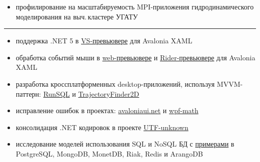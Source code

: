 \documentclass[10pt,a4paper,ragged2e,withhyper]{altacv}
\begin{document}
\begin{paracol}{2}
\begin{itemize}
  \item профилирование на масштабируемость  MPI-приложения
  \newline гидродинамического моделирования на выч.\,кластере УГАТУ

\end{itemize}

{\color{headingrule}\rule{\linewidth}{1pt}\par}\medskip


\smallskip

\begin{itemize}

  \item поддержка .NET 5 в
  \href{https://github.com/AvaloniaUI/AvaloniaVS/pull/181}{VS-превьювере}
  для Avalonia XAML 
  \smallskip

  \item обработка событий мыши в
  \href{https://github.com/AvaloniaUI/Avalonia/pull/4418}{web-превьювере}
  и \href{https://github.com/ForNeVeR/AvaloniaRider/pull/82}{Rider-превьювере}
  для Avalonia XAML 
  \smallskip

  \item разработка кроссплатформенных desktop-приложений, используя MVVM-паттерн:
  \href{https://github.com/rstm-sf/RunSQL}{RunSQL} и
  \href{https://github.com/rstm-sf/TrajectoryFinder2D}{TrajectoryFinder2D}
  \smallskip

  \item исправление ошибок в проектах:
  \href{https://github.com/AvaloniaUI/avaloniaui.net/commits?author=rstm-sf}{avaloniaui.net} и
  \href{https://github.com/ForNeVeR/wpf-math/commits?author=rstm-sf}{wpf-math}
  \smallskip

  \item консолидация .NET кодировок в проекте 
  \href{https://github.com/CharsetDetector/UTF-unknown/commits?author=rstm-sf}{UTF-unknown}
  \smallskip

  \item исследование моделей использования SQL и NoSQL БД с
  \href{https://bitbucket.org/rstm-sf/game_with_db}{примерами} в
  PostgreSQL, MongoDB, MonetDB, Riak, Redis и ArangoDB

\end{itemize}

\switchcolumn



\end{paracol}
\end{document}
